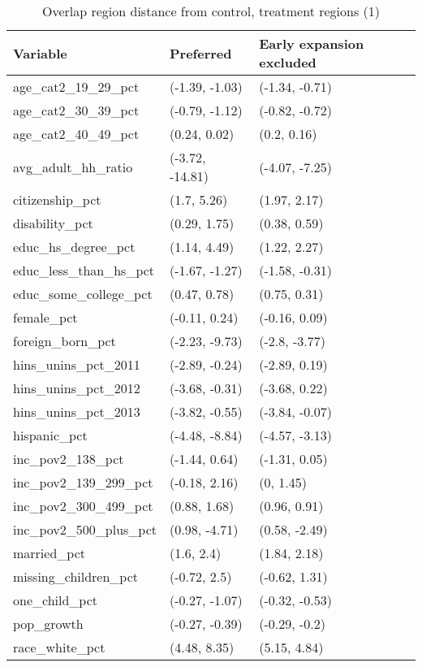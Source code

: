 \begin{table}[ht]
\centering
    \caption{Overlap region distance from control, treatment regions (1)}
    \label{tab:oatedist1}
\begin{tabular}{lll}
  \hline
Variable & Preferred & Early expansion excluded \\ 
  \hline
age\_cat2\_19\_29\_pct & (-1.39, -1.03) & (-1.34, -0.71) \\ 
  age\_cat2\_30\_39\_pct & (-0.79, -1.12) & (-0.82, -0.72) \\ 
  age\_cat2\_40\_49\_pct & (0.24, 0.02) & (0.2, 0.16) \\ 
  avg\_adult\_hh\_ratio & (-3.72, -14.81) & (-4.07, -7.25) \\ 
  citizenship\_pct & (1.7, 5.26) & (1.97, 2.17) \\ 
  disability\_pct & (0.29, 1.75) & (0.38, 0.59) \\ 
  educ\_hs\_degree\_pct & (1.14, 4.49) & (1.22, 2.27) \\ 
  educ\_less\_than\_hs\_pct & (-1.67, -1.27) & (-1.58, -0.31) \\ 
  educ\_some\_college\_pct & (0.47, 0.78) & (0.75, 0.31) \\ 
  female\_pct & (-0.11, 0.24) & (-0.16, 0.09) \\ 
  foreign\_born\_pct & (-2.23, -9.73) & (-2.8, -3.77) \\ 
  hins\_unins\_pct\_2011 & (-2.89, -0.24) & (-2.89, 0.19) \\ 
  hins\_unins\_pct\_2012 & (-3.68, -0.31) & (-3.68, 0.22) \\ 
  hins\_unins\_pct\_2013 & (-3.82, -0.55) & (-3.84, -0.07) \\ 
  hispanic\_pct & (-4.48, -8.84) & (-4.57, -3.13) \\ 
  inc\_pov2\_138\_pct & (-1.44, 0.64) & (-1.31, 0.05) \\ 
  inc\_pov2\_139\_299\_pct & (-0.18, 2.16) & (0, 1.45) \\ 
  inc\_pov2\_300\_499\_pct & (0.88, 1.68) & (0.96, 0.91) \\ 
  inc\_pov2\_500\_plus\_pct & (0.98, -4.71) & (0.58, -2.49) \\ 
  married\_pct & (1.6, 2.4) & (1.84, 2.18) \\ 
  missing\_children\_pct & (-0.72, 2.5) & (-0.62, 1.31) \\ 
  one\_child\_pct & (-0.27, -1.07) & (-0.32, -0.53) \\ 
  pop\_growth & (-0.27, -0.39) & (-0.29, -0.2) \\ 
  race\_white\_pct & (4.48, 8.35) & (5.15, 4.84) \\ 

\end{tabular}
\end{table}
